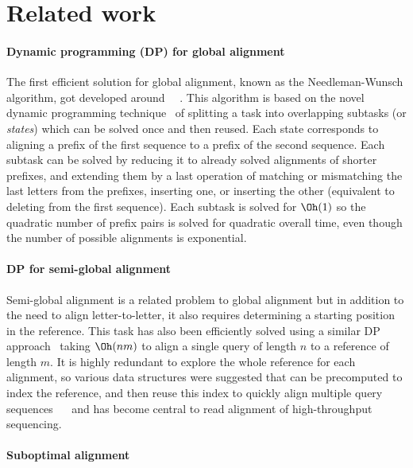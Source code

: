 \section*{Related work}

\paragraph{Dynamic programming (DP) for global alignment}
The first efficient solution for global alignment, known as the Needleman-Wunsch
algorithm, got developed around~\citeyear{vintsyuk1968speech}~
\cite{vintsyuk1968speech,needleman1970general}. This algorithm is based on the
novel dynamic programming technique~\cite{bellman1954theory} of splitting a task
into overlapping subtasks (or \emph{states}) which can be solved once and then
reused. Each state corresponds to aligning a prefix of the first sequence to a
prefix of the second sequence. Each subtask can be solved by reducing it to
already solved alignments of shorter prefixes, and extending them by a last
operation of matching or mismatching the last letters from the prefixes,
inserting one, or inserting the other (equivalent to deleting from the first
sequence). Each subtask is solved for $\Oh(1)$ so the quadratic number of prefix
pairs is solved for quadratic overall time, even though the number of possible
alignments is exponential.

\paragraph{DP for semi-global alignment}
Semi-global alignment is a related problem to global alignment but in addition
to the need to align letter-to-letter, it also requires determining a starting
position in the reference. This task has also been efficiently solved using a
similar DP approach~\cite{sellers1980theory,smith1981identification} taking
$\Oh(nm)$ to align a single query of length $n$ to a reference of length $m$. It
is highly redundant to explore the whole reference for each alignment, so
various data structures were suggested that can be precomputed to index the
reference, and then reuse this index to quickly align multiple query sequences
~\citeyear{pearson1988improved}~\cite{pearson1988improved} and has become
central to read alignment of high-throughput sequencing.


\paragraph{Suboptimal alignment}

